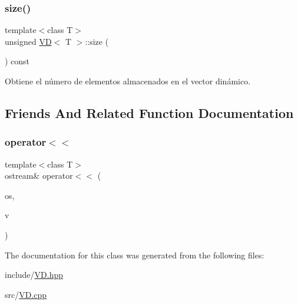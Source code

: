 \mbox{\label{class_v_d_a72e3d07e6d332f9e19512048d9e38c00}} 
\subsubsection{\texorpdfstring{size()}{size()}}
{\footnotesize\ttfamily template$<$class T$>$ \\
unsigned \mbox{\hyperlink{class_v_d}{VD}}$<$ T $>$\+::size (\begin{DoxyParamCaption}{ }\end{DoxyParamCaption}) const\hspace{0.3cm}{\ttfamily [inline]}}



Obtiene el número de elementos almacenados en el vector dinámico. 



\subsection{Friends And Related Function Documentation}
\mbox{\label{class_v_d_a734c0c269d63f56fbced245e3c36f518}} 
\subsubsection{\texorpdfstring{operator$<$$<$}{operator<<}}
{\footnotesize\ttfamily template$<$class T$>$ \\
ostream\& operator$<$$<$ (\begin{DoxyParamCaption}\item[{ostream \&}]{os,  }\item[{\mbox{\hyperlink{class_v_d}{VD}}$<$ T $>$ \&}]{v }\end{DoxyParamCaption})\hspace{0.3cm}{\ttfamily [friend]}}



The documentation for this class was generated from the following files\+:\begin{DoxyCompactItemize}
\item 
include/\mbox{\hyperlink{_v_d_8hpp}{V\+D.\+hpp}}\item 
src/\mbox{\hyperlink{_v_d_8cpp}{V\+D.\+cpp}}\end{DoxyCompactItemize}
